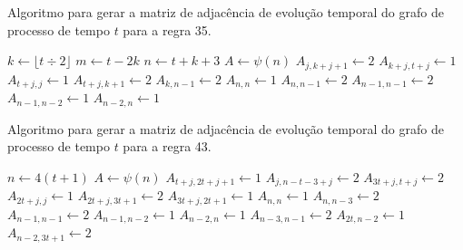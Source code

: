 \documentclass[12pt,a4paper]{article}
\begin{document}
\begin{algorithm}[H]
\caption{Algoritmo para gerar a matriz de adjacência de evolução temporal do
grafo de processo de tempo $t$ para a regra 35.}
\label{alg:r35}
\begin{algorithmic}
\STATE $k \leftarrow \lfloor t \div 2 \rfloor$
\STATE $m \leftarrow t - 2k$
\STATE $n \leftarrow t+k+3$
\STATE $A \leftarrow \psi(n)$
        \STATE $A_{j,k+j+1} \leftarrow 2$
    \ENDFOR
\ENDIF
{}
    \STATE $A_{k+j,t+j} \leftarrow 1$
\ENDFOR
{}
        \STATE $A_{t+j,j} \leftarrow 1$
    \ENDFOR
\ENDIF
{}
    \STATE $A_{t+j,k+1} \leftarrow 2$
\ENDFOR
{}
    \STATE $A_{k,n-1} \leftarrow 2$
\ENDIF
\STATE $A_{n,n} \leftarrow 1$
\STATE $A_{n,n-1} \leftarrow 2$
\STATE $A_{n-1,n-1} \leftarrow 2$
\STATE $A_{n-1,n-2} \leftarrow 1$
\STATE $A_{n-2,n} \leftarrow 1$
\end{algorithmic}
\end{algorithm}

\begin{algorithm}[H]
\caption{Algoritmo para gerar a matriz de adjacência de evolução temporal do
grafo de processo de tempo $t$ para a regra 43.}
\label{alg:r43}
\begin{algorithmic}
\STATE $n \leftarrow 4(t+1)$
\STATE $A \leftarrow \psi(n)$
        \STATE $A_{t+j,2t+j+1} \leftarrow 1$
    \ENDFOR
\ENDIF
{}
    \STATE $A_{j,n-t-3+j} \leftarrow 2$
    \STATE $A_{3t+j,t+j} \leftarrow 2$
    \STATE $A_{2t+j,j} \leftarrow 1$
    \STATE $A_{2t+j,3t+1} \leftarrow 2$
\ENDFOR
{}
    \STATE $A_{3t+j,2t+1} \leftarrow 1$
\ENDFOR
\STATE $A_{n,n} \leftarrow 1$
\STATE $A_{n,n-3} \leftarrow 2$
\STATE $A_{n-1,n-1} \leftarrow 2$
\STATE $A_{n-1,n-2} \leftarrow 1$
\STATE $A_{n-2,n} \leftarrow 1$
\STATE $A_{n-3,n-1} \leftarrow 2$
\STATE $A_{2t,n-2} \leftarrow 1$
\STATE $A_{n-2,3t+1} \leftarrow 2$
\end{algorithmic}
\end{algorithm}
\end{document}
